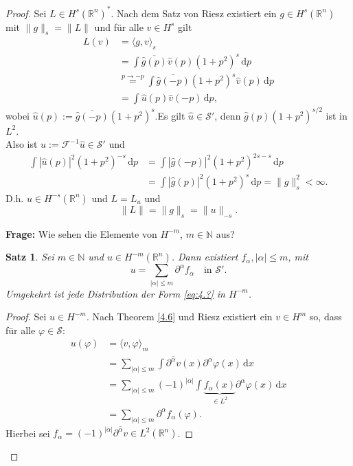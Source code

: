 \documentclass[
paper=a4,
bibtotocnumbered,
liststotocnumbered,
tablecaptionabove,
pointlessnumbers,
twoside,
openright,
10pt
]
{report}
\let\phi\varphi
\newtheorem{satz}[thm]{Satz}
\theoremstyle{definition}
\numberwithin{equation}{chapter}
\begin{document}
\begin{proof}
Sei $L\in H^s(\mathbb R^n)^*$. Nach dem Satz von Riesz existiert ein $g\in H^s(\mathbb R^n)$ mit $\|g\|_s = \|L\|$ und für alle $v\in H^s$ gilt
\begin{align*}
L(v) &= \langle g,v\rangle_s \\
&= \int \overline{\hat g(p)} \hat v(p) (1+p^2)^s \, \mathrm dp\\
&\stackrel{p\to -p}= \int \overline{\hat g(-p)} (1+p^2)^s \hat v(p) \, \mathrm dp\\
&= \int \hat u(p) \hat v(-p) \, \mathrm dp,
\end{align*}
wobei $\hat u(p):= \overline{\hat g(-p)} (1+p^2)^s$.Es gilt 
$\hat u\in \mathcal S'$, denn $\hat g(p) (1+p^2)^{s/2}$ ist in $L^2$. 
\\Also ist $u:= \mathcal F^{-1}\hat u \in \mathcal S'$ und
\begin{align}
\int|\hat u (p)|^2 (1+p^2)^{-s}\, \mathrm dp&=\int |\hat g(-p)|^2 (1+p^2)^{2s-s}\, \mathrm dp\\
&= \int |\hat g(p)|^2(1+p^2)^s\, \mathrm dp = \| g\|_s^2 <\infty.
\end{align}
D.h. $u\in H^{-s}(\mathbb R^n)$ und $L= L_u$ und
\begin{equation}
\|L\| = \|g\|_s = \|u\|_{-s}.
\end{equation}

\textbf{Frage:} Wie sehen die Elemente von $H^{-m}$, $m\in \mathbb N$ aus?

\begin{satz}\label{4.7}
Sei $m\in \mathbb N$ und $u\in H^{-m}(\mathbb R^n)$. Dann existiert $f_\alpha, |\alpha|\le m$, mit
\begin{equation}\label{eq:4.?}
u = \sum_{|\alpha|\le m} \partial^\alpha f_\alpha \quad \text{in } \mathcal S'.
\end{equation}
Umgekehrt ist jede Distribution der Form \eqref{eq:4.?} in $H^{-m}$.
\end{satz}
\begin{proof}
Sei $u\in H^{-m}$. Nach Theorem \ref{4.6} und Riesz existiert ein $v\in H^m$ so, dass für alle $\phi \in \mathcal S$:
\begin{align}
u(\phi) &= \langle v, \phi\rangle_m\\
&= \sum_{|\alpha|\le m} \int \overline{\partial^\alpha v}(x) \partial^\alpha \phi(x)\, \mathrm dx\\
&= \sum_{|\alpha|\le m} (-1)^{|\alpha|} \int \underbrace{f_\alpha(x)}_{\in L^2} \partial^\alpha \phi(x) \, \mathrm dx\\
&= \sum_{|\alpha|\le m} \partial^\alpha f_\alpha (\phi).
\end{align}
Hierbei sei $f_\alpha= (-1)^{|\alpha|} \overline{\partial^\alpha v} \in L^2(\mathbb R^n)$.


\end{proof}
\end{proof}
\end{document}
